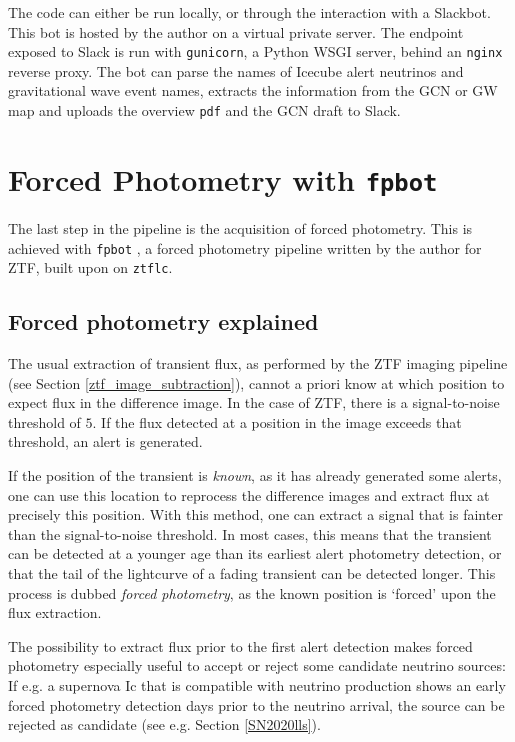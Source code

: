 \documentclass[
    a4paper, %
    fontsize=10pt, %
    twoside=true, %
    numbers=noenddot, %
    fontmethod=tex,
]{kaobook}
\begin{document}
The code can either be run locally, or through the interaction with a Slackbot. This bot is hosted by the author on a virtual private server. The endpoint exposed to Slack is run with \texttt{gunicorn}, a Python WSGI server, behind an \texttt{nginx} reverse proxy. The bot can parse the names of Icecube alert neutrinos and gravitational wave event names, extracts the information from the GCN or GW map and uploads the overview \texttt{pdf} and the GCN draft to Slack.

\section{Forced Photometry with \texttt{fpbot}} \label{fpbot}
The last step in the pipeline is the acquisition of forced photometry. This is achieved with \texttt{fpbot} , a forced photometry pipeline written by the author for ZTF, built upon on \texttt{ztflc}.

\subsection{Forced photometry explained}
The usual extraction of transient flux, as performed by the ZTF imaging pipeline (see Section \ref{ztf_image_subtraction}), cannot a priori know at which position to expect flux in the difference image. In the case of ZTF, there is a signal-to-noise threshold of $5$. If the flux detected at a position in the image exceeds that threshold, an alert is generated.

If the position of the transient is \textit{known}, as it has already generated some alerts, one can use this location to reprocess the difference images and extract flux at precisely this position. With this method, one can extract a signal that is fainter than the signal-to-noise threshold. In most cases, this means that the transient can be detected at a younger age than its earliest alert photometry detection, or that the tail of the lightcurve of a fading transient can be detected longer. This process is dubbed \textit{forced photometry}, as the known position is `forced' upon the flux extraction.

The possibility to extract flux prior to the first alert detection makes forced photometry especially useful to accept or reject some candidate neutrino sources: If e.g. a supernova Ic that is compatible with neutrino production shows an early forced photometry detection days prior to the neutrino arrival, the source can be rejected as candidate (see e.g. Section \ref{SN2020lls}).
\end{document}
